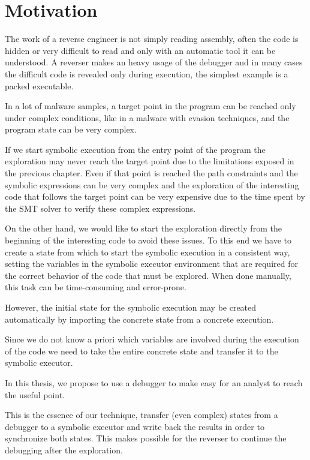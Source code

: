 \section{Motivation}

The work of a reverse engineer is not simply reading assembly, often the code is hidden or very difficult to read and only with an automatic tool it can be understood.
A reverser makes an heavy usage of the debugger and in many cases the difficult code is revealed only during execution, the simplest example is a packed executable.

In a lot of malware samples, a target point in the program can be reached only under complex conditions, like in a malware with evasion techniques, and the program state can be very complex.

If we start symbolic execution from the entry point of the program the exploration may never reach the target point due to the limitations exposed in the previous chapter.
Even if that point is reached the path constraints and the symbolic expressions can be very complex and the exploration of the interesting code that follows the target point can be very expensive due to the time spent by the SMT solver to verify these complex expressions.

On the other hand, we would like to start the exploration directly from the beginning of the interesting code to avoid these issues. To this end we have to create a state from which to start the symbolic execution in a consistent way, setting the variables in the symbolic executor environment that are required for the correct behavior of the code that must be explored.
When done manually, this task can be time-consuming and error-prone.

However, the initial state for the symbolic execution may be created automatically by importing the concrete state from a concrete execution.

Since we do not know a priori which variables are involved during the execution of the code we need to take the entire concrete state and transfer it to the symbolic executor.

In this thesis, we propose to use a debugger to make easy for an analyst to reach the useful point.

This is the essence of our technique, transfer (even complex) states from a debugger to a symbolic executor and write back the results in order to synchronize both states. This makes possible for the reverser to continue the debugging after the exploration.

